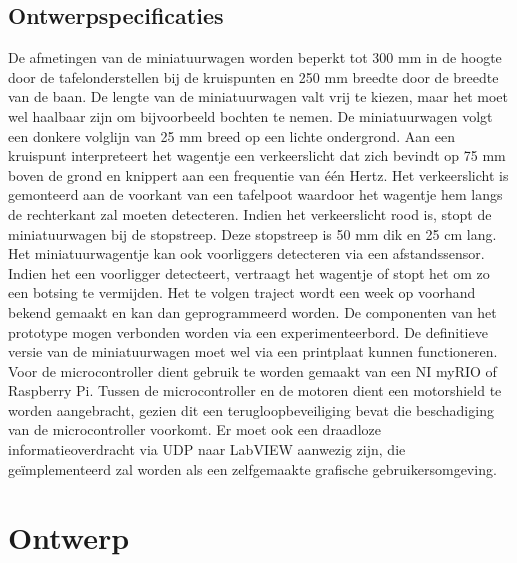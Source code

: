 \documentclass[a4paper,kulak]{kulakarticle}
\begin{document}
\subsection{Ontwerpspecificaties}
De afmetingen van de miniatuurwagen worden beperkt tot 300 mm in de hoogte door de tafelonderstellen bij de kruispunten en 250 mm breedte door de breedte van de baan. De lengte van de miniatuurwagen valt vrij te kiezen, maar het moet wel haalbaar zijn om bijvoorbeeld bochten te nemen. De miniatuurwagen volgt een donkere volglijn van 25 mm breed op een lichte ondergrond. Aan een kruispunt interpreteert het wagentje een verkeerslicht dat zich bevindt op 75 mm boven de grond en knippert aan een frequentie van één Hertz. Het verkeerslicht is gemonteerd aan de voorkant van een tafelpoot waardoor het wagentje hem langs de rechterkant zal moeten detecteren.  Indien het verkeerslicht rood is, stopt de miniatuurwagen bij de stopstreep. Deze stopstreep is 50 mm dik en 25 cm lang. Het miniatuurwagentje kan ook voorliggers detecteren via een afstandssensor. Indien het een voorligger detecteert, vertraagt het wagentje of stopt het om zo een botsing te
vermijden. Het te volgen traject wordt een week op voorhand bekend gemaakt en kan
dan geprogrammeerd worden. De componenten van het prototype mogen verbonden worden via een experimenteerbord. De definitieve versie van de miniatuurwagen moet wel via een printplaat kunnen functioneren. Voor de microcontroller dient gebruik te worden
gemaakt van een NI myRIO of Raspberry Pi. Tussen de microcontroller en de motoren dient een motorshield te worden aangebracht, gezien dit een terugloopbeveiliging
bevat die beschadiging van de microcontroller voorkomt. Er moet ook een draadloze informatieoverdracht via UDP naar LabVIEW aanwezig zijn, die geïmplementeerd zal worden als een zelfgemaakte grafische gebruikersomgeving. 


\section{Ontwerp}
\end{document}

